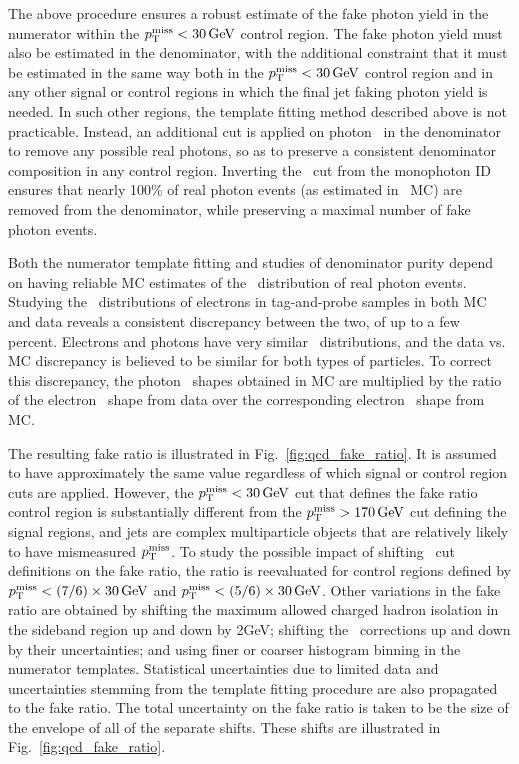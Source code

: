 The above procedure ensures a robust estimate of the fake photon yield in the numerator within the $\MET < 30\unit{GeV}$ control region.
The fake photon yield must also be estimated in the denominator, with the
additional constraint that it must be estimated in the same way both in the $\MET < 30\unit{GeV}$ control region and in any other signal or control regions in which
the final jet faking photon yield is needed. In such other regions, the template fitting method described above is not practicable. Instead, an additional
cut is applied on photon \sieie\ in the denominator to remove any possible real photons, so as to preserve a consistent denominator composition in any control region.
Inverting the \sieie\ cut from the monophoton ID ensures that nearly 100\% of real photon events (as estimated in \gjets\ MC) are removed from the denominator,
while preserving a maximal number of fake photon events.

Both the numerator template fitting and studies of denominator purity depend on having reliable MC estimates of the \sieie\ distribution of real photon events.
Studying the \sieie\ distributions of electrons in tag-and-probe samples in both MC and data reveals a consistent discrepancy between the two, of up to a few percent.
Electrons and photons have very similar \sieie\ distributions, and the data vs. MC discrepancy is believed to be similar
for both types of particles. To correct this discrepancy, the photon \sieie\ shapes obtained in MC are multiplied by the ratio of the electron \sieie\ shape from data
over the corresponding electron \sieie\ shape from MC.

The resulting fake ratio is illustrated in Fig.~\ref{fig:qcd_fake_ratio}.
It is assumed to have approximately the same value regardless of which signal or control region cuts are applied. However, the $\MET < 30\unit{GeV}$ cut
that defines the fake ratio control region is substantially different from the $\MET > 170\unit{GeV}$ cut defining the signal regions, and jets
are complex multiparticle objects that are relatively likely to have mismeasured $\MET$.
To study the possible impact of shifting \MET\ cut definitions on the fake ratio,
the ratio is reevaluated for control regions defined by $\MET < (7/6)\times30\unit{GeV}$ and $\MET < (5/6)\times30\unit{GeV}$.
Other variations in the fake ratio are obtained by shifting the maximum allowed charged hadron isolation in the sideband region up and down by 2\unit{GeV};
shifting the \sieie\ corrections up and down by their uncertainties; and using finer or coarser histogram binning in the numerator templates. Statistical
uncertainties due to limited data and uncertainties stemming from the template fitting procedure are also propagated to the fake ratio. The total uncertainty
on the fake ratio is taken to be the size of the envelope of all of the separate shifts. These shifts are illustrated in Fig.~\ref{fig:qcd_fake_ratio}.

